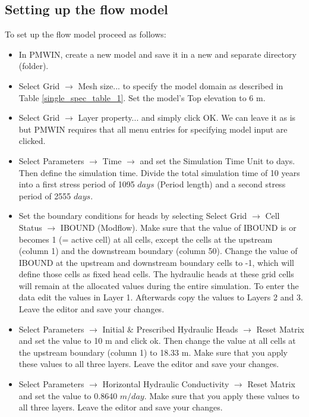\subsection{Setting up the flow model}

To set up the flow model proceed as follows:

\begin{itemize}

\item In PMWIN, create a new model and save it in a new and separate directory (folder).

\item Select Grid $\rightarrow$ Mesh size... to specify the model domain as described in
Table \ref{single_spec_table_1}. Set the model's Top elevation to 6 m.

\item Select Grid $\rightarrow$ Layer property... and simply click OK. We can leave it as is but PMWIN requires that all menu entries for specifying model input are clicked.

\item Select Parameters $\rightarrow$ Time $\rightarrow$ and set the Simulation Time Unit to days. Then define the simulation time. Divide the total simulation time
of 10 years into a first stress period of 1095 $days$ (Period length) and a
second stress period of 2555 $days$. 

\item Set the boundary conditions for heads by selecting Select Grid $\rightarrow$ Cell Status $\rightarrow$ IBOUND (Modflow). Make sure that the value of IBOUND is or becomes 1 (= active cell) at all cells, except the cells at the upstream (column 1) and the downstream boundary (column 50). 
Change the value of IBOUND at the upstream and downstream boundary cells to -1,
which will define those cells as fixed head cells. The hydraulic heads
at these grid cells will remain at the allocated values during the entire simulation.
To enter the data edit the values in Layer 1. Afterwards copy the values
to Layers 2 and 3. Leave the editor and save your changes.

\item Select Parameters $\rightarrow$ Initial \& Prescribed Hydraulic Heads $\rightarrow$ Reset Matrix and set the value to 10 m and click ok. Then change the value at all cells at the upstream boundary (column 1) to 18.33 m. Make sure that you apply these values to all three layers. Leave the editor and save your changes.

\item Select Parameters $\rightarrow$ Horizontal Hydraulic Conductivity $\rightarrow$ Reset Matrix and set the value to 0.8640 $m/day$. Make sure that you apply these values to all three layers. Leave the editor and save your changes.


\end{itemize}
